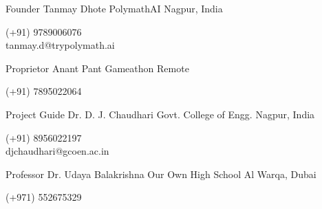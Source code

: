 \documentclass[11pt, a4paper]{awesome-cv}
\begin{document}

\begin{cventries}

\cventry
  {Founder}
  {Tanmay Dhote}
  {PolymathAI}
  {Nagpur, India}
  {}
  \raggedright{\small\faMobile \hspace{4pt} (+91) 9789006076 \\
  \faEnvelope \hspace{4pt} tanmay.d@trypolymath.ai}

  \vskip 0.25cm

  \cventry
  {Proprietor}
  {Anant Pant}
  {Gameathon}
  {Remote}
  {}
  \raggedright{\small\faMobile \hspace{4pt} (+91) 7895022064 }
  
  \vskip 0.25cm

  \cventry
  {Project Guide}
  {Dr. D. J. Chaudhari}
  {Govt. College of Engg.}
  {Nagpur, India}
  {}
  \raggedright{\small\faMobile \hspace{4pt} (+91) 8956022197 \\
  \faEnvelope \hspace{4pt} djchaudhari@gcoen.ac.in}

  \vskip 0.25cm

  \cventry
  {Professor}
  {Dr. Udaya Balakrishna}
  {Our Own High School}
  {Al Warqa, Dubai}
  {}
  \raggedright{\small\faMobile \hspace{4pt} (+971) 552675329}
   


\end{cventries}
\end{document}
